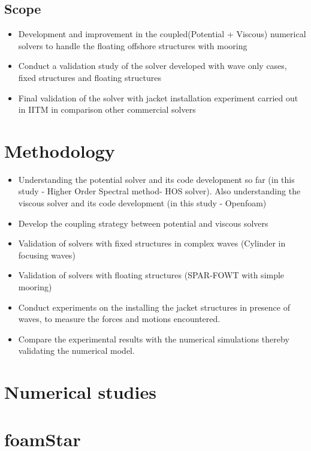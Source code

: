 \documentclass[preprint,12pt]{article}
\begin{document}
{\subsection*{Scope}
\begin{itemize}
  \item Development and improvement in the coupled(Potential + Viscous) numerical solvers to handle the floating offshore structures with mooring
  \item Conduct a validation study of the solver developed  with wave only cases, fixed structures and floating structures
  \item Final validation of the solver with jacket installation experiment carried out in IITM in comparison other commercial solvers 
  
\end{itemize}

\section{Methodology}
\begin{itemize}
    \item Understanding the potential solver and its code development so far (in this study - Higher Order Spectral method- HOS solver\cite{DUCROZET201219}). Also understanding the viscous solver and its code development (in this study - Openfoam) 
    \item Develop the coupling strategy between potential and viscous solvers 
    \item Validation of solvers with fixed structures in complex waves (Cylinder in focusing waves)
    \item Validation of solvers with floating structures (SPAR-FOWT with simple mooring)
    \item Conduct experiments on the installing the jacket structures in presence of waves, to measure the forces and motions encountered. 
    \item Compare the experimental results with the numerical simulations thereby validating the
numerical model.
\end{itemize}
\section{Numerical studies}
\section*{foamStar}

}
\end{document}
